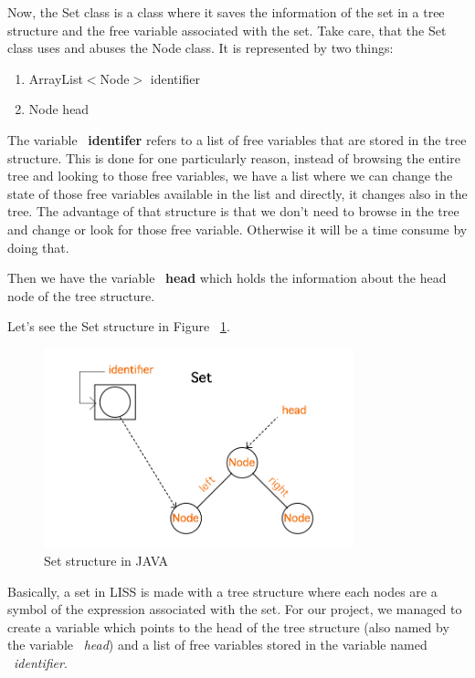 \documentclass[
  oneside,
  11pt, a4paper,
  footinclude=true,
  headinclude=true,
  cleardoublepage=empty
]{scrbook}
\begin{document}
Now, the Set class is a class where it saves the information of the set in a tree structure and the free variable associated with the set. Take care, that the Set class uses and abuses the Node class.
It is represented by two things:

\begin{enumerate}
\item ArrayList$<$Node$>$ identifier
\item Node head
\end{enumerate}

The variable ~\textbf{identifer} refers to a list of free variables that are stored in the tree structure. This is done for one particularly reason, instead of browsing the entire tree and looking to those free variables, we have a list where we can change the state of those free variables available in the list and directly, it changes also in the tree. The advantage of that structure is that we don't need to browse in the tree and change or look for those free variable. Otherwise it will be a time consume by doing that.

Then we have the variable ~\textbf{head} which holds the information about the head node of the tree structure.

Let's see the Set structure in Figure ~\ref{fig:set_structure}.

\begin{figure}[h!]
 \centering
  \includegraphics[width=0.8\textwidth]{img/set_structure.png}
  \caption{Set structure in JAVA}
  \label{fig:set_structure}
\end{figure}

Basically, a set in LISS is made with a tree structure where each nodes are a symbol of the expression associated with the set.
For our project, we managed to create a variable which points to the head of the tree structure (also named by the variable ~\textit{head}) and a list of free variables stored in the variable named ~\textit{identifier}.
\end{document}
